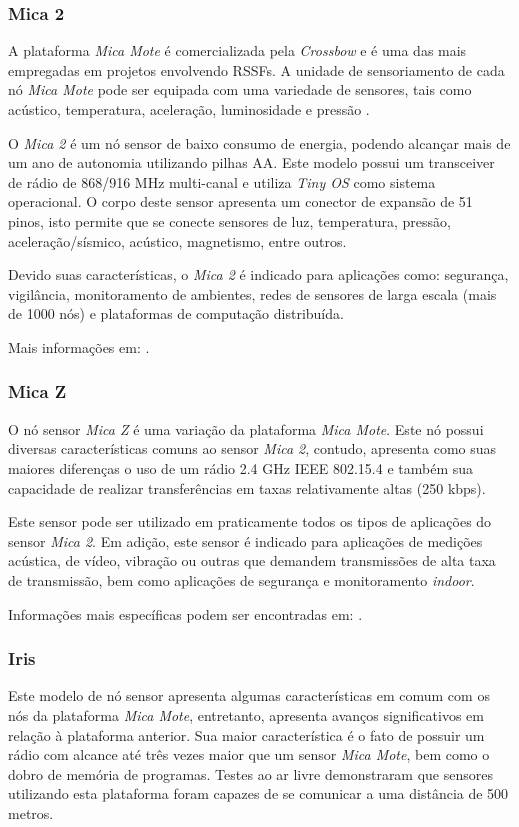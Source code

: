 \subsubsection{Mica 2}
A plataforma \emph{Mica Mote} é comercializada pela \emph{Crossbow} e é uma das mais empregadas em projetos envolvendo RSSFs. A unidade de sensoriamento de cada nó \emph{Mica Mote} pode ser equipada com uma variedade de sensores, tais como acústico, temperatura, aceleração, luminosidade e pressão \cite{Ruiz2004}.

O \emph{Mica 2} é um nó sensor de baixo consumo de energia, podendo alcançar mais de um ano de autonomia utilizando pilhas AA. Este modelo possui um transceiver de rádio de 868/916 MHz multi-canal e utiliza \emph{Tiny OS} como sistema operacional.
O corpo deste sensor apresenta um conector de expansão de 51 pinos, isto permite que se conecte sensores de luz, temperatura, pressão, aceleração/sísmico, acústico, magnetismo, entre outros.

Devido suas características, o \emph{Mica 2} é indicado para aplicações como: segurança, vigilância, monitoramento de ambientes, redes de sensores de larga escala (mais de 1000 nós) e plataformas de computação distribuída.

Mais informações em: \cite{Mica2}.

\subsubsection{Mica Z}
O nó sensor \emph{Mica Z} é uma variação da plataforma \emph{Mica Mote}. Este nó possui diversas características comuns ao sensor \emph{Mica 2}, contudo, apresenta como suas maiores diferenças o uso de um rádio 2.4 GHz IEEE 802.15.4 e também sua capacidade de realizar transferências em taxas relativamente altas (250 kbps).

Este sensor pode ser utilizado em praticamente todos os tipos de aplicações do sensor \emph{Mica 2}. Em adição, este sensor é indicado para aplicações de medições acústica, de vídeo, vibração ou outras que demandem transmissões de alta taxa de transmissão, bem como aplicações de segurança e monitoramento \emph{indoor}.

Informações mais específicas podem ser encontradas em: \cite{MicaZ}.

\subsubsection{Iris}
Este modelo de nó sensor apresenta algumas características em comum com os nós da plataforma \emph{Mica Mote}, entretanto, apresenta avanços significativos em relação à plataforma anterior. Sua maior característica é o fato de possuir um rádio com alcance até três vezes maior que um sensor \emph{Mica Mote}, bem como o dobro de memória de programas.
Testes ao ar livre demonstraram que sensores utilizando esta plataforma foram capazes de se comunicar a uma distância de 500 metros.

